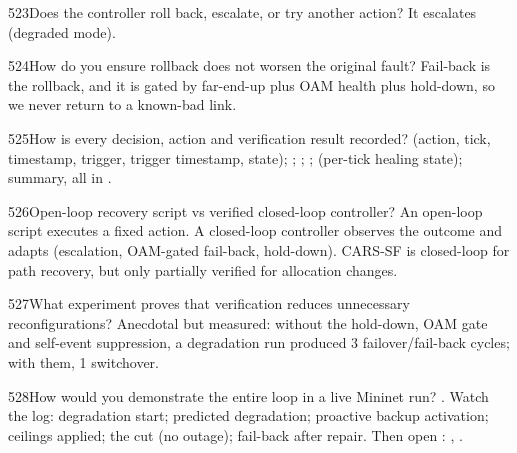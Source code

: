 \begin{qa}{523}{Does the controller roll back, escalate, or try another action?}
It escalates (degraded mode).
\end{qa}

\begin{qa}{524}{How do you ensure rollback does not worsen the original fault?}
Fail-back is the rollback, and it is gated by far-end-up plus OAM health plus hold-down, so we never return to a
known-bad link.
\end{qa}

\begin{qa}{525}{How is every decision, action and verification result recorded?}
 (action, tick, timestamp, trigger, trigger timestamp, state); ;
; ;  (per-tick healing state); 
summary, all in .
\end{qa}

\begin{qa}{526}{Open-loop recovery script vs verified closed-loop controller?}
An open-loop script executes a fixed action. A closed-loop controller observes the outcome and adapts (escalation,
OAM-gated fail-back, hold-down). CARS-SF is closed-loop for path recovery, but only partially verified for allocation
changes.
\end{qa}

\begin{qa}{527}{What experiment proves that verification reduces unnecessary reconfigurations?}
Anecdotal but measured: without the hold-down, OAM gate and self-event suppression, a degradation run produced 3
failover/fail-back cycles; with them, 1 switchover.
\end{qa}

\begin{qa}{528}{How would you demonstrate the entire loop in a live Mininet run?}
. Watch the
log: degradation start; predicted degradation; proactive backup activation; ceilings applied; the cut (no outage);
fail-back after repair. Then open : , .
\end{qa}

